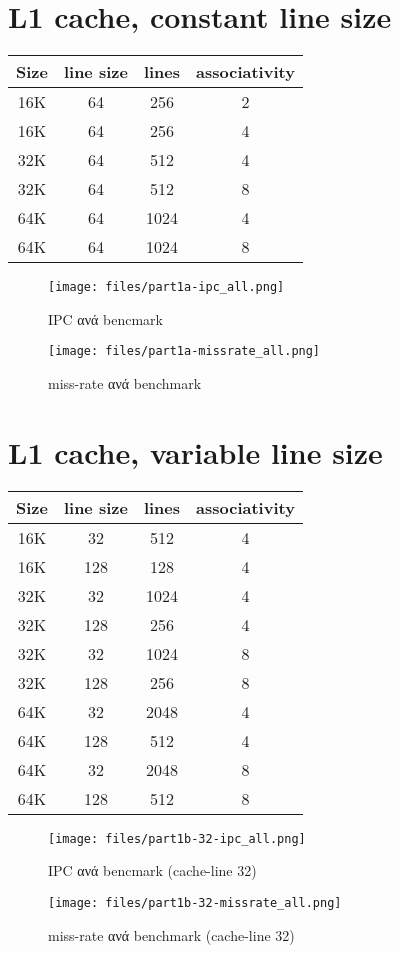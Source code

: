 \documentclass[a4paper,9pt]{article}
\begin{document}
\def\thesection {\roman{section}: }



\section{L1 cache, constant line size}
\begin{tabular}{c c c c}
    Size & line size & lines & associativity\\ 
    \hline
    \hline
    16K   & 64 &  256  & 2\\
    16K   & 64 &  256  & 4\\
    \hline
    32K   & 64 &  512  & 4\\
    32K   & 64 &  512  & 8\\
    \hline
    64K   & 64 &  1024 & 4\\
    64K   & 64 &  1024 & 8\\
\end{tabular}
\begin{figure}[H]
    \texttt{[image: files/part1a-ipc\_all.png]}
    \caption{IPC ανά bencmark}
\end{figure}

\begin{figure}[H]
    \texttt{[image: files/part1a-missrate\_all.png]}
    \caption{miss-rate ανά benchmark}
\end{figure}

\section{L1 cache, variable line size}
\begin{tabular}{c c c c}
    Size & line size &lines & associativity\\ 
    \hline
    \hline
    16K & 32    & 512   & 4\\
    16K & 128   & 128   & 4\\
    \hline
    32K & 32    & 1024  & 4\\
    32K & 128   & 256   & 4\\
    32K & 32    & 1024  & 8\\
    32K & 128   & 256   & 8\\
    \hline
    64K & 32    & 2048  & 4\\
    64K & 128   & 512   & 4\\
    64K & 32    & 2048  & 8\\
    64K & 128   & 512   & 8\\
\end{tabular}
\begin{figure}[H]
    \texttt{[image: files/part1b-32-ipc\_all.png]}
    \caption{IPC ανά bencmark (cache-line 32)}
\end{figure}
\begin{figure}[H]
    \texttt{[image: files/part1b-32-missrate\_all.png]}
    \caption{miss-rate ανά benchmark (cache-line 32)}
\end{figure}
\end{document}

